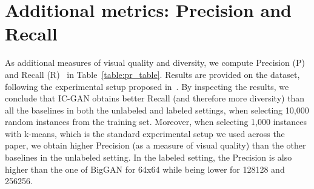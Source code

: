 \section{Additional metrics: Precision and Recall}
\label{app:pr_metrics}
As additional measures of visual quality and diversity, we compute Precision (P) and Recall (R)~\cite{kynkaanniemi2019improved} in Table~\ref{table:pr_table}. Results are provided on the \ImNet dataset, following the experimental setup proposed in~\cite{naeem2020reliable}. 
By inspecting the results, we conclude that IC-GAN obtains better Recall (and therefore more diversity) than all the baselines in both the unlabeled and labeled settings, when selecting 10,000 random instances from the training set. Moreover,  when selecting 1,000 instances with k-means, which is the standard experimental setup we used across the paper,  we obtain higher Precision (as a measure of visual quality) than the other baselines in the unlabeled setting. 
In the labeled setting, the Precision is also higher than the one of BigGAN for 64x64 while being  lower for 128128 and 256256.

